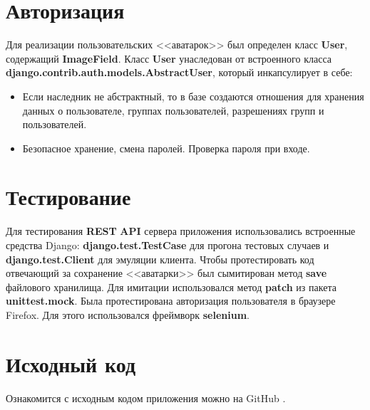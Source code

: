 \section{Авторизация}
Для реализации пользовательских <<аватарок>> был определен класс \textbf{User}, содержащий \textbf{ImageField}. Класс \textbf{User} унаследован от встроенного класса \sloppy\textbf{django.contrib.auth.models.AbstractUser}, который инкапсулирует в себе:
\begin{itemize}
  \item Если наследник не абстрактный, то в базе создаются отношения для хранения данных о пользователе, группах пользователей, разрешениях групп и пользователей.
  \item Безопасное хранение, смена паролей. Проверка пароля при входе.
\end{itemize}
\section{Тестирование}
Для тестирования \textbf{REST} \textbf{API} сервера приложения использовались встроенные средства Django: \textbf{django.test.TestCase} для прогона тестовых случаев и \textbf{django.test.Client} для эмуляции клиента.
Чтобы протестировать код отвечающий за сохранение <<аватарки>> был сымитирован метод \textbf{save} файлового хранилища. Для имитации использовался метод \textbf{patch} из пакета \textbf{unittest.mock}. Была протестирована авторизация пользователя в браузере Firefox. Для этого использовался фреймворк \textbf{selenium}.
\section{Исходный код}
Ознакомится с исходным кодом приложения можно на GitHub \cite{project_source}.
\pagebreak
